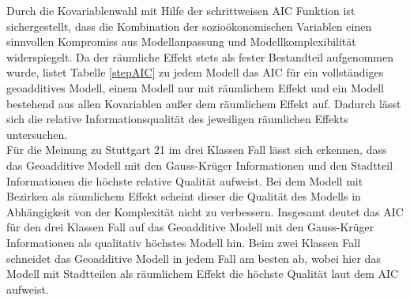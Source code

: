 \documentclass{Vorlage}
\begin{document}
Durch die Kovariablenwahl mit Hilfe der schrittweisen AIC Funktion ist sichergestellt, dass die Kombination der sozioökonomischen Variablen einen sinnvollen Kompromiss aus Modellanpassung und Modellkomplexibilität widerspiegelt. Da der räumliche Effekt stets als fester Bestandteil aufgenommen wurde, listet Tabelle \ref{stepAIC} zu jedem Modell das AIC für ein vollständiges geoadditives Modell, einem Modell nur mit räumlichem Effekt und ein Modell bestehend aus allen Kovariablen außer dem räumlichem Effekt auf. Dadurch lässt sich die relative Informationsqualität des jeweiligen räumlichen Effekts untersuchen. \\
Für die Meinung zu Stuttgart 21 im drei Klassen Fall lässt sich erkennen, dass das Geoadditive Modell mit den Gauss-Krüger Informationen und den Stadtteil Informationen die höchste relative Qualität aufweist. Bei dem Modell mit Bezirken als räumlichem Effekt scheint dieser die Qualität des Modells in Abhängigkeit von der Komplexität nicht zu verbessern. Insgesamt deutet das AIC für den drei Klassen Fall auf das Geoadditive Modell mit den Gauss-Krüger Informationen als qualitativ höchstes Modell hin. Beim zwei Klassen Fall schneidet das Geoadditive Modell in jedem Fall am besten ab, wobei hier das Modell mit Stadtteilen als räumlichem Effekt die höchste Qualität laut dem AIC aufweist.
\end{document}
